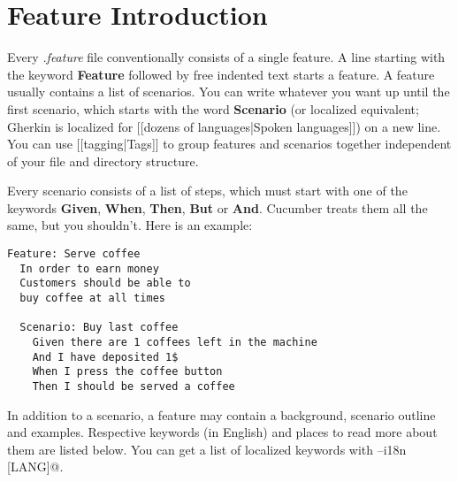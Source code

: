 \documentclass[10pt]{book}
\begin{document}
\chapter{Feature Introduction}

Every \emph{.feature} file conventionally consists of a single feature. A line starting with the keyword \textbf{Feature} followed by free indented text starts a feature. A feature usually contains a list of scenarios. You can write whatever you want up until the first scenario, which starts with the word \textbf{Scenario} (or localized equivalent; Gherkin is localized for [[dozens of languages|Spoken languages]]) on a new line. You can use [[tagging|Tags]] to group features and scenarios together independent of your file and directory structure.

Every scenario consists of a list of steps, which must start with one of the keywords \textbf{Given}, \textbf{When}, \textbf{Then}, \textbf{But} or \textbf{And}. Cucumber treats them all the same, but you shouldn't. Here is an example:

\begin{verbatim}
Feature: Serve coffee
  In order to earn money
  Customers should be able to 
  buy coffee at all times

  Scenario: Buy last coffee
    Given there are 1 coffees left in the machine
    And I have deposited 1$
    When I press the coffee button
    Then I should be served a coffee

\end{verbatim}
In addition to a scenario, a feature may contain a background, scenario outline and examples.  Respective keywords (in English) and places to read more about them are listed below.  You can get a list of localized keywords with \verb@cucumber --i18n [LANG]@.
\end{document}
